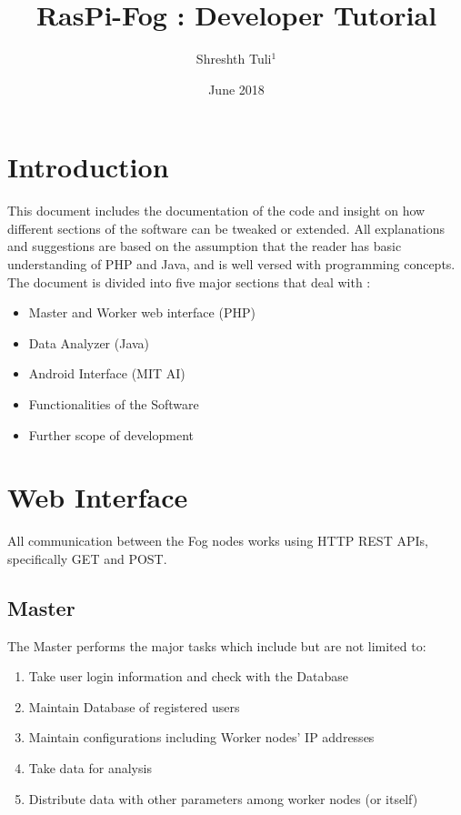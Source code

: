 \documentclass{article}
\title{RasPi-Fog : Developer Tutorial}
\author{Shreshth Tuli$^{1}$}
\date{June 2018}
\begin{document}
\maketitle

\section{Introduction}
This document includes the documentation of the code and insight on how different sections of the software can be tweaked or extended. All explanations and suggestions are based on the assumption that the reader has basic understanding of PHP and Java, and is well versed with programming concepts. \\
The document is divided into five major sections that deal with : 
\begin{itemize}
\item Master and Worker web interface (PHP)
\item Data Analyzer (Java)
\item Android Interface (MIT AI)
\item Functionalities of the Software
\item Further scope of development
\end{itemize}

\section{Web Interface}
All communication between the Fog nodes works using HTTP REST APIs, specifically GET and POST. 
\subsection{Master}
The Master performs the major tasks which include but are not limited to:
\begin{enumerate}
\item Take user login information and check with the Database
\item Maintain Database of registered users
\item Maintain configurations including Worker nodes' IP addresses
\item Take data for analysis
\item Distribute data with other parameters among worker nodes (or itself)
\end{enumerate}
\end{document}
